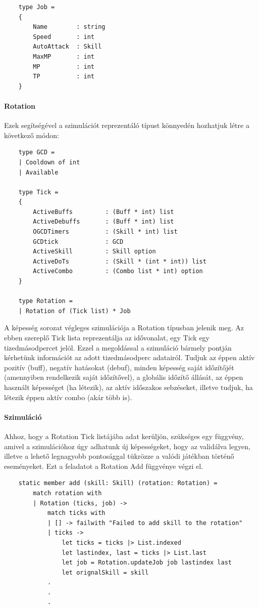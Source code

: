 \documentclass[12pt]{article}
\begin{document}
	\begin{lstlisting}
	type Job =
	{
		Name        : string
		Speed       : int
		AutoAttack  : Skill
		MaxMP       : int
		MP          : int
		TP          : int
	}
	\end{lstlisting}
	
	\paragraph{Rotation}
	
	Ezek segítségével a szimulációt reprezentáló típust könnyedén hozhatjuk létre a következő módon:
	
	\begin{lstlisting}
	type GCD =
	| Cooldown of int
	| Available
	
	type Tick =
	{
		ActiveBuffs         : (Buff * int) list
		ActiveDebuffs       : (Buff * int) list
		OGCDTimers          : (Skill * int) list
		GCDtick             : GCD
		ActiveSkill         : Skill option
		ActiveDoTs          : (Skill * (int * int)) list
		ActiveCombo         : (Combo list * int) option
	}
	
	type Rotation = 
	| Rotation of (Tick list) * Job
	\end{lstlisting}
	
	\pagebreak
	
	A képesség sorozat végleges szimulációja a Rotation típusban jelenik meg. Az ebben szereplő Tick lista reprezentálja az idővonalat, egy Tick egy tizedmásodpercet jelöl.
	Ezzel a megoldással a szimuláció bármely pontján kérhetünk információt az adott tizedmásodperc adatairól. 
	Tudjuk az éppen aktív pozitív (buff), negatív hatásokat (debuf), minden képesség saját időzítőjét (amennyiben rendelkezik saját időzítővel), 
	a globális időzítő állását, az éppen használt képességet (ha létezik), az aktív időszakos sebzéseket, illetve tudjuk, ha létezik éppen aktív combo (akár több is).
	
	\paragraph{Szimuláció}
	
	Ahhoz, hogy a Rotation Tick listájába adat kerüljön, szükséges egy függvény, amivel a szimulációhoz úgy adhatunk új képességeket, hogy az validálva legyen, illetve a lehető legnagyobb pontosággal tükrözze a valódi játékban történő eseményeket.
	Ezt a feladatot a Rotation Add függvénye végzi el. 
	
	\begin{lstlisting}
	static member add (skill: Skill) (rotation: Rotation) =
		match rotation with
		| Rotation (ticks, job) ->
			match ticks with
			| [] -> failwith "Failed to add skill to the rotation"
			| ticks ->
				let ticks = ticks |> List.indexed
				let lastindex, last = ticks |> List.last
				let job = Rotation.updateJob job lastindex last
				let orignalSkill = skill
			.
			.
			.
	\end{lstlisting}
	
\end{document}
